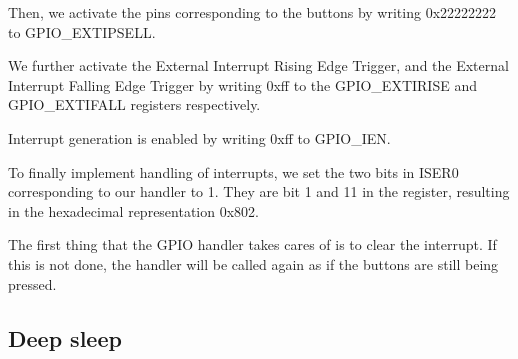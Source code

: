 Then, we activate the pins corresponding to the buttons by writing 0x22222222 to GPIO\_EXTIPSELL.

We further activate the External Interrupt Rising Edge Trigger, and the External Interrupt Falling Edge Trigger by writing 0xff to the GPIO\_EXTIRISE and GPIO\_EXTIFALL registers respectively.

Interrupt generation is enabled by writing 0xff to GPIO\_IEN.

To finally implement handling of interrupts, we set the two bits in ISER0 corresponding to our handler to 1. They are bit 1 and 11 in the register, resulting in the hexadecimal representation 0x802.

The first thing that the GPIO handler takes cares of is to clear the interrupt. If this is not done, the handler will be called again as if the buttons are still being pressed.

\subsection{Deep sleep}
\label{subsec:dev_pros_deep_sleep}
